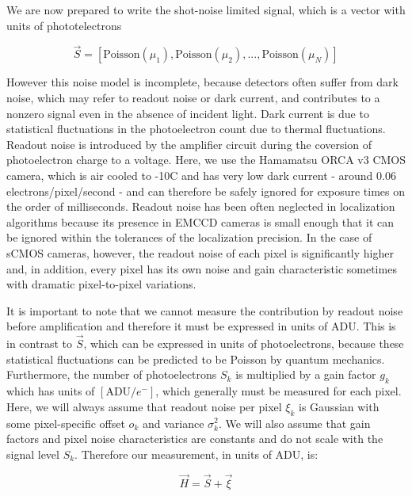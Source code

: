 \documentclass{ucetd}
\begin{document}
We are now prepared to write the shot-noise limited signal, which is a vector with units of phototelectrons

\begin{equation}
\vec{S} = \left[\mathrm{Poisson}(\mu_{1}), \mathrm{Poisson}(\mu_{2}), ..., \mathrm{Poisson}(\mu_{N})\right]
\end{equation}


However this noise model is incomplete, because detectors often suffer from dark noise, which may refer to readout noise or dark current, and contributes to a nonzero signal even in the absence of incident light. Dark current is due to statistical fluctuations in the photoelectron count due to thermal fluctuations. Readout noise is introduced by the amplifier circuit during the coversion of photoelectron charge to a voltage. Here, we use the Hamamatsu ORCA v3 CMOS camera, which is air cooled to -10C and has very low dark current - around 0.06 electrons/pixel/second - and can therefore be safely ignored for exposure times on the order of milliseconds. Readout noise has been often neglected in localization algorithms because its presence in EMCCD cameras is small enough that it can be ignored within the tolerances of the localization precision. In the case of sCMOS cameras, however, the readout noise of each pixel is significantly higher and, in addition, every pixel has its own noise and gain characteristic sometimes with dramatic pixel-to-pixel variations.

It is important to note that we cannot measure the contribution by readout noise before amplification and therefore it must be expressed in units of $\mathrm{ADU}$. This is in contrast to $\vec{S}$, which can be expressed in units of photoelectrons, because these statistical fluctuations can be predicted to be Poisson by quantum mechanics. Furthermore, the number of photoelectrons $S_{k}$ is  multiplied by a gain factor $g_{k}$ which has units of $[\mathrm{ADU}/e^{-}]$, which generally must be measured for each pixel. Here, we will always assume that readout noise per pixel $\xi_{k}$ is Gaussian with some pixel-specific offset $o_{k}$ and variance $\sigma_{k}^{2}$. We will also assume that gain factors and pixel noise characteristics are constants and do not scale with the signal level $S_{k}$. Therefore our measurement, in units of ADU, is: 

\begin{equation}
\vec{H} = \vec{S} + \vec{\xi}
\end{equation}
\end{document}
